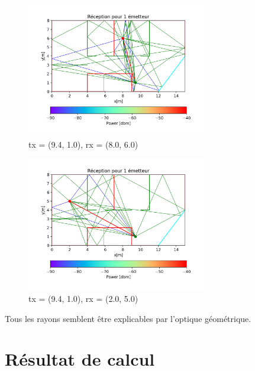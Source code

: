 \documentclass[sn-mathphys-num]{sn-jnl}
\begin{document}
\begin{figure}[H]
    \centering
    \includegraphics[width=0.7\textwidth]{images/verif/rayons_complex.png}
    \caption{tx = (9.4, 1.0), rx = (8.0, 6.0)}
\end{figure}

\begin{figure}[H]
    \centering
    \includegraphics[width=0.7\textwidth]{images/verif/rayons_complex_2.png}
    \caption{tx = (9.4, 1.0), rx = (2.0, 5.0)}
\end{figure}

Tous les rayons semblent être explicables par l'optique géométrique.
    

\section{Résultat de calcul}
\end{document}
